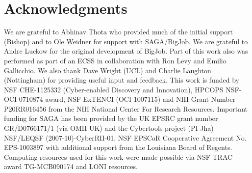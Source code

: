 \documentclass{sig-alternate}
\begin{document}
\section{Acknowledgments}
We are grateful to Abhinav Thota who provided much of the initial
support (Bishop) and to Ole Weidner for support with SAGA/BigJob. We
are grateful to Andre Luckow for the original development of
BigJob. Part of this work also was performed as part of an ECSS in
collaboration with Ron Levy and Emilio Gallicchio. We also thank Dave
Wright (UCL) and Charlie Laughton (Nottingham) for providing useful
input and feedback.  This work is funded by NSF CHE-1125332
(Cyber-enabled Discovery and Innovation), HPCOPS NSF-OCI 0710874
award, NSF-ExTENCI (OCI-1007115) and NIH Grant Number P20RR016456 from
the NIH National Center For Research Resources. Important funding for
SAGA has been provided by the UK EPSRC grant number GR/D0766171/1 (via
OMII-UK) and the Cybertools project (PI Jha) NSF/LEQSF
(2007-10)-CyberRII-01, NSF EPSCoR Cooperative Agreement
No. EPS-1003897 with additional support from the Louisiana Board of
Regents.  Computing resources used for this work were made possible
via NSF TRAC award TG-MCB090174 and LONI resources.






\end{document}
